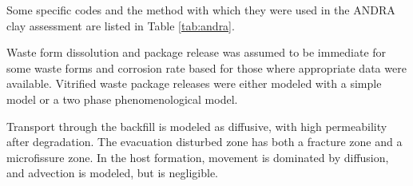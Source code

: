 {Some specific codes and the method with which they were used in the \gls{ANDRA} 
clay assessment are listed in Table  \ref{tab:andra}.












Waste form dissolution and package release was assumed to be immediate for some
waste forms and corrosion rate based for those where appropriate data were
available. Vitrified waste package releases were either modeled with a simple
model or a two phase phenomenological model. 


Transport through the backfill is modeled as diffusive, with high permeability 
after degradation.  The evacuation disturbed zone has both a fracture zone and a 
microfissure zone.  In the host formation, movement is dominated by diffusion, 
and advection is modeled, but is negligible.



% 

}
